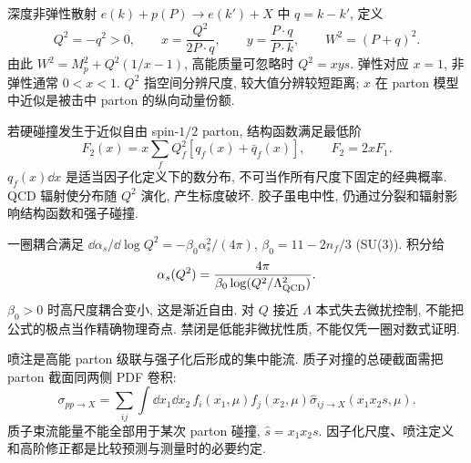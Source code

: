 深度非弹性散射 $e(k)+p(P)\to e(k')+X$ 中 $q=k-k'$, 定义
\begin{equation}
 Q^2=-q^2>0,\qquad x=\frac{Q^2}{2P\cdot q},\qquad y=\frac{P\cdot q}{P\cdot k},\qquad W^2=(P+q)^2.
\end{equation}
由此 $W^2=M_p^2+Q^2(1/x-1)$, 高能质量可忽略时 $Q^2=xys$. 弹性对应 $x=1$, 非弹性通常 $0<x<1$. $Q^2$ 指空间分辨尺度, 较大值分辨较短距离; $x$ 在 parton 模型中近似是被击中 parton 的纵向动量份额.

若硬碰撞发生于近似自由 spin-$1/2$ parton, 结构函数满足最低阶
\begin{equation}
 F_2(x)=x\sum_fQ_f^2[q_f(x)+\bar q_f(x)],\qquad F_2=2xF_1.
\end{equation}
$q_f(x)\dd x$ 是适当因子化定义下的数分布, 不可当作所有尺度下固定的经典概率. QCD 辐射使分布随 $Q^2$ 演化, 产生标度破坏. 胶子虽电中性, 仍通过分裂和辐射影响结构函数和强子碰撞.

一圈耦合满足 $\dd\alpha_s/\dd\log Q^2=-\beta_0\alpha_s^2/(4\pi)$, $\beta_0=11-2n_f/3$ (SU(3)). 积分给
\begin{equation}
 \alpha_s(Q^2)=\frac{4\pi}{\beta_0\log(Q^2/\Lambda_{\rm QCD}^2)}.
\end{equation}
$\beta_0>0$ 时高尺度耦合变小, 这是渐近自由. 对 $Q$ 接近 $\Lambda$ 本式失去微扰控制, 不能把公式的极点当作精确物理奇点. 禁闭是低能非微扰性质, 不能仅凭一圈对数式证明.

喷注是高能 parton 级联与强子化后形成的集中能流. 质子对撞的总硬截面需把 parton 截面同两侧 PDF 卷积:
\begin{equation}
 \sigma_{pp\to X}=\sum_{ij}\int\dd x_1\dd x_2\,f_i(x_1,\mu)f_j(x_2,\mu)
 \widehat\sigma_{ij\to X}(x_1x_2s,\mu).
\end{equation}
质子束流能量不能全部用于某次 parton 碰撞, $\widehat s=x_1x_2s$. 因子化尺度、喷注定义和高阶修正都是比较预测与测量时的必要约定.
